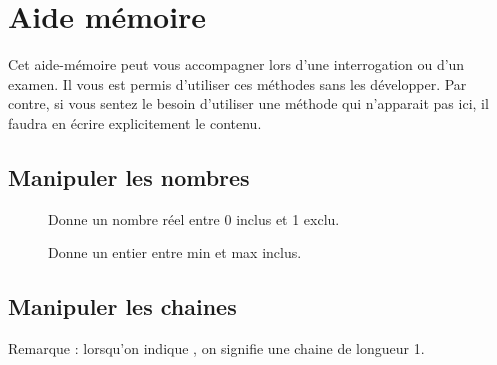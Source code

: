 \chapter{Aide mémoire}

	Cet aide-mémoire peut vous accompagner lors d'une
	interrogation ou d'un examen. 
	Il vous est permis d’utiliser ces méthodes sans les développer.
	Par contre, si vous sentez le besoin d’utiliser 
	une méthode qui n'apparait pas ici, 
	il faudra en écrire explicitement le contenu.

\section*{Manipuler les nombres}

	\begin{description}
	\item[]
			Donne un nombre réel entre 0 inclus et 1 exclu.
	\item[]
		Donne un entier entre min et max inclus.
	\end{description}
	
	
\section*{Manipuler les chaines}
	
	Remarque : lorsqu'on indique ,
	on signifie une chaine de longueur 1.
	
